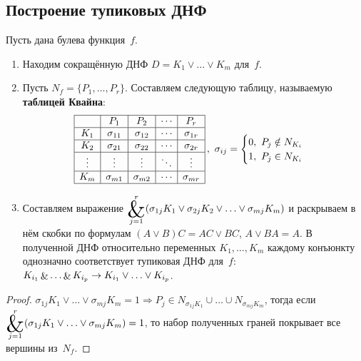 \subsection{Построение тупиковых ДНФ}
Пусть дана булева функция~$f$.
\begin{enumerate}
	\item Находим сокращённую ДНФ $D = K_1 \lor \ldots \lor K_m$ для~$f$.
	
	\item Пусть $N_f = \{ P_1, \ldots, P_r \}$.
	Составляем следующую таблицу, называемую \textbf{таблицей Квайна}:
	\begin{equation*}
	\begin{array}{|c|c|c|c|c|}
	\hline
	    & P_1 & P_2 & \cdots & P_r \\
    \hline
	K_1 & \sigma_{11} & \sigma_{12} & \cdots & \sigma_{1r} \\
	\hline
	K_2 & \sigma_{21} & \sigma_{22} & \cdots & \sigma_{2r} \\
	\hline
	\vdots & \vdots & \vdots & \ddots & \vdots \\
	\hline
	K_m & \sigma_{m1} & \sigma_{m2} & \cdots & \sigma_{mr} \\
	\hline
	\end{array}\,, \
	\sigma_{ij} =
	\begin{cases}
	0, \ P_j \notin N_{K_i} \\
	1, \ P_j \in N_{K_i}
	\end{cases}
	\end{equation*}
	
	\item Составляем выражение $\displaystyle \bigAnd_{j=1}^r (\sigma_{1j} K_1 \lor \sigma_{2j} K_2 \lor \ldots \lor \sigma_{mj} K_m)$ и раскрываем в нём скобки по формулам $(A \lor B)C = AC \lor BC$, $A \lor BA = A$.
	В полученной ДНФ относительно переменных $K_1, \ldots, K_m$ каждому конъюнкту однозначно соответствует тупиковая ДНФ для~$f$: $K_{i_1} \And \ldots \And K_{i_p} \to K_{i_1} \opbr\lor \ldots \opbr\lor K_{i_p}$.
\end{enumerate}
\begin{proof}
$\sigma_{1j} K_1 \lor \ldots \lor \sigma_{mj} K_m = 1 \Rightarrow
P_j \in N_{\sigma_{1j} K_1} \cup \ldots \cup N_{\sigma_{mj} K_m}$, тогда если
$\displaystyle \bigAnd_{j=1}^r (\sigma_{1j} K_1 \opbr\lor \ldots \opbr\lor \sigma_{mj} K_m) = 1$, то набор полученных граней покрывает все вершины из~$N_f$.
\end{proof}